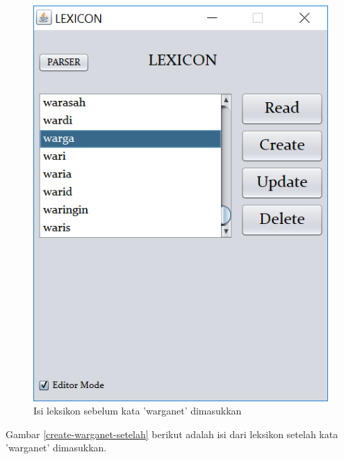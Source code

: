 \begin{figure}[H]
\centering
\includegraphics[scale=0.7]{Gambar/create-warganet-sebelum}
\caption{Isi leksikon sebelum kata 'warganet' dimasukkan} 
\label{create-warganet-sebelum}
\end{figure}

Gambar \ref{create-warganet-setelah} berikut adalah isi dari leksikon setelah kata 'warganet' dimasukkan.

